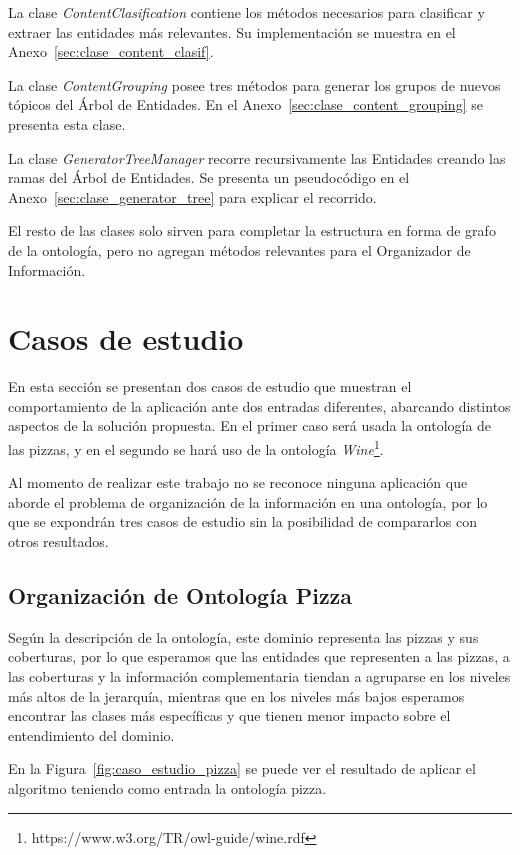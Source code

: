 La clase \emph{ContentClasification} contiene los métodos necesarios para clasificar y extraer las entidades más relevantes. Su implementación se muestra en el Anexo~\ref{sec:clase_content_clasif}.

La clase \emph{ContentGrouping} posee tres métodos para generar los grupos de nuevos tópicos del Árbol de Entidades. En el Anexo~\ref{sec:clase_content_grouping} se presenta esta clase.

La clase \emph{GeneratorTreeManager} recorre recursivamente las Entidades creando las ramas del Árbol de Entidades. Se presenta un pseudocódigo en el Anexo~\ref{sec:clase_generator_tree} para explicar el recorrido.

El resto de las clases solo sirven para completar la estructura en forma de grafo de la ontología, pero no agregan métodos relevantes para el Organizador de Información.



\section{Casos de estudio}
En esta sección se presentan dos casos de estudio que muestran el comportamiento de la aplicación ante dos entradas diferentes, abarcando distintos aspectos de la solución propuesta. En el primer caso será usada la ontología de las pizzas, y en el segundo se hará uso de la ontología \emph{Wine}\footnote{https://www.w3.org/TR/owl-guide/wine.rdf}.

Al momento de realizar este trabajo no se reconoce ninguna aplicación que aborde el problema de organización de la información en una ontología, por lo que se expondrán tres casos de estudio sin la posibilidad de compararlos con otros resultados.

\subsection{Organización de Ontología Pizza}
Según la descripción de la ontología, este dominio representa las pizzas y sus coberturas, por lo que esperamos que las entidades que representen a las pizzas, a las coberturas y la información complementaria tiendan a agruparse en los niveles más altos de la jerarquía, mientras que en los niveles más bajos esperamos encontrar las clases más específicas y que tienen menor impacto sobre el entendimiento del dominio.

En la Figura~\ref{fig:caso_estudio_pizza} se puede ver el resultado de aplicar el algoritmo teniendo como entrada la ontología pizza. 

